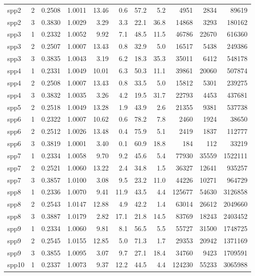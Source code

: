 \documentclass[12pt, a4paper]{article}
\begin{document}
\begin{longtable}{llrrrrrrrrr}
spp2 & 2 & 0.2508 & 1.0011 & 13.46 & 0.6 & 57.2 & 5.2 & 4951 & 2834 & 89619 \\
spp2 & 3 & 0.3830 & 1.0029 & 3.29 & 3.3 & 22.1 & 36.8 & 14868 & 3293 & 180162 \\
spp3 & 1 & 0.2332 & 1.0052 & 9.92 & 7.1 & 48.5 & 11.5 & 46786 & 22670 & 616360 \\
spp3 & 2 & 0.2507 & 1.0007 & 13.43 & 0.8 & 32.9 & 5.0 & 16517 & 5438 & 249386 \\
spp3 & 3 & 0.3835 & 1.0043 & 3.19 & 6.2 & 18.3 & 35.3 & 35011 & 6412 & 548178 \\
spp4 & 1 & 0.2331 & 1.0049 & 10.01 & 6.3 & 50.3 & 11.1 & 39861 & 20060 & 507874 \\
spp4 & 2 & 0.2508 & 1.0007 & 13.43 & 0.8 & 33.5 & 5.0 & 15812 & 5301 & 239275 \\
spp4 & 3 & 0.3832 & 1.0035 & 3.26 & 4.2 & 19.5 & 31.7 & 22793 & 4453 & 437681 \\
spp5 & 2 & 0.2518 & 1.0049 & 13.28 & 1.9 & 43.9 & 2.6 & 21355 & 9381 & 537738 \\
spp6 & 1 & 0.2322 & 1.0007 & 10.62 & 0.6 & 78.2 & 7.8 & 2460 & 1924 & 38650 \\
spp6 & 2 & 0.2512 & 1.0026 & 13.48 & 0.4 & 75.9 & 5.1 & 2419 & 1837 & 112777 \\
spp6 & 3 & 0.3819 & 1.0001 & 3.40 & 0.1 & 60.9 & 18.8 & 184 & 112 & 33219 \\
spp7 & 1 & 0.2334 & 1.0058 & 9.70 & 9.2 & 45.6 & 5.4 & 77930 & 35559 & 1522111 \\
spp7 & 2 & 0.2521 & 1.0060 & 13.22 & 2.4 & 34.8 & 1.5 & 36327 & 12641 & 935257 \\
spp7 & 3 & 0.3857 & 1.0100 & 3.08 & 9.5 & 23.2 & 11.0 & 44226 & 10271 & 964729 \\
spp8 & 1 & 0.2336 & 1.0070 & 9.41 & 11.9 & 43.5 & 4.4 & 125677 & 54630 & 3126858 \\
spp8 & 2 & 0.2543 & 1.0147 & 12.88 & 4.9 & 42.2 & 1.4 & 63014 & 26612 & 2049660 \\
spp8 & 3 & 0.3887 & 1.0179 & 2.82 & 17.1 & 21.8 & 14.5 & 83769 & 18243 & 2403452 \\
spp9 & 1 & 0.2334 & 1.0060 & 9.81 & 8.1 & 56.5 & 5.5 & 55727 & 31500 & 1748725 \\
spp9 & 2 & 0.2545 & 1.0155 & 12.85 & 5.0 & 71.3 & 1.7 & 29353 & 20942 & 1371169 \\
spp9 & 3 & 0.3855 & 1.0095 & 3.07 & 9.7 & 27.1 & 18.4 & 34760 & 9423 & 1709591 \\
spp10 & 1 & 0.2337 & 1.0073 & 9.37 & 12.2 & 44.5 & 4.4 & 124230 & 55233 & 3065988 \\

\end{longtable}
\end{document}
